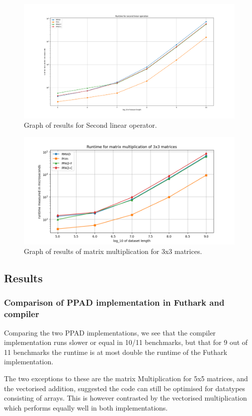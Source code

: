 \documentclass{article}
\begin{document}
\begin{figure}[h]
	\includegraphics[width=\textwidth]{graphofruntime.png}
	\caption{Graph of results for Second linear operator.}
\end{figure}
\begin{figure}[h]
	\includegraphics[width=\textwidth]{graphofruntime2.png}
	\caption{Graph of results of matrix multiplication for 3x3 matrices.}
\end{figure}
\subsection{Results}
\subsubsection*{Comparison of PPAD implementation in Futhark and compiler}
Comparing the two PPAD implementations,
we see that the compiler implementation runs slower or equal in 10/11 benchmarks,
but that for 9 out of 11 benchmarks the runtime is at most double the
runtime of the Futhark implementation.

The two exceptions to these are the matrix Multiplication for 5x5 matrices,
and the vectorised addition,
suggested the code can still be optimised for datatypes consisting of
arrays.
This is however contrasted by the vectorised multiplication which performs
equally well in both implementations.
\end{document}
